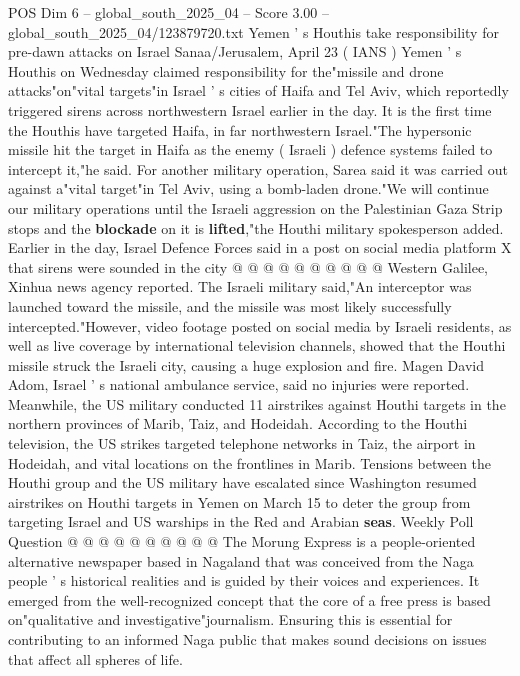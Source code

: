 \begin{textsample}{POS Dim 6 – global\_south\_2025\_04 – Score 3.00 – global\_south\_2025\_04/123879720.txt}  \label{ex:f6_pos_284}
Yemen ' s Houthis take responsibility for pre-dawn attacks on Israel Sanaa/Jerusalem, April 23 ( IANS ) Yemen ' s Houthis on Wednesday claimed responsibility for the"missile and drone attacks"on"vital targets"in Israel ' s cities of Haifa and Tel Aviv, which reportedly triggered sirens across northwestern Israel earlier in the day.
It is the first time the Houthis have targeted Haifa, in far northwestern Israel."The hypersonic missile hit the target in Haifa as the enemy ( Israeli ) defence systems failed to intercept it,"he said.
For another military operation, Sarea said it was carried out against a"vital target"in Tel Aviv, using a bomb-laden drone."We will continue our military operations until the Israeli aggression on the Palestinian Gaza Strip stops and the \textbf{blockade} on it is \textbf{lifted},"the Houthi military spokesperson added.
Earlier in the day, Israel Defence Forces said in a post on social media platform X that sirens were sounded in the city @ @ @ @ @ @ @ @ @ @ Western Galilee, Xinhua news agency reported.
The Israeli military said,"An interceptor was launched toward the missile, and the missile was most likely successfully intercepted."However, video footage posted on social media by Israeli residents, as well as live coverage by international television channels, showed that the Houthi missile struck the Israeli city, causing a huge explosion and fire.
Magen David Adom, Israel ' s national ambulance service, said no injuries were reported.
Meanwhile, the US military conducted 11 airstrikes against Houthi targets in the northern provinces of Marib, Taiz, and Hodeidah.
According to the Houthi television, the US strikes targeted telephone networks in Taiz, the airport in Hodeidah, and vital locations on the frontlines in Marib.
Tensions between the Houthi group and the US military have escalated since Washington resumed airstrikes on Houthi targets in Yemen on March 15 to deter the group from targeting Israel and US warships in the Red and Arabian \textbf{seas}.
Weekly Poll Question @ @ @ @ @ @ @ @ @ @ The Morung Express is a people-oriented alternative newspaper based in Nagaland that was conceived from the Naga people ' s historical realities and is guided by their voices and experiences.
It emerged from the well-recognized concept that the core of a free press is based on"qualitative and investigative"journalism.
Ensuring this is essential for contributing to an informed Naga public that makes sound decisions on issues that affect all spheres of life.

\end{textsample}
